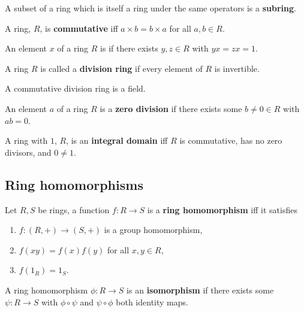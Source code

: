 \documentclass[../Year2.tex]{subfiles}
\begin{document}
\begin{definition}[Subring]
    A subset of a ring which is itself a ring under the same operators is a \textbf{subring}.
\end{definition}

\begin{definition}
    A ring, $R$, is \textbf{commutative} iff $a\times b=b\times a$ for all $a,b\in R$.
\end{definition}

\begin{definition}[Invertible]
    An element $x$ of a ring $R$ is  if there exists $y,z\in R$ with $yx=zx=1$.
\end{definition}

\begin{definition}
    A ring $R$ is called a \textbf{division ring} if every element of $R$ is invertible.
\end{definition}

\begin{remark}
    A commutative division ring is a field.
\end{remark}

\begin{definition}
    An element $a$ of a ring $R$ is a \textbf{zero division} if there exists some $b\neq0\in R$ with $ab=0$.
\end{definition}

\begin{definition}
    A ring with $1$, $R$, is an \textbf{integral domain} iff $R$ is commutative, has no zero divisors, and $0\neq 1$.
\end{definition}

\subsection{Ring homomorphisms}

\begin{definition}
    Let $R,S$ be rings, a function $f:R\rightarrow S$ is a \textbf{ring homomorphism} iff it satisfies \begin{enumerate}
        \item $f:(R,+)\rightarrow (S,+)$ is a group homomorphism,
        \item $f(xy)=f(x)f(y)$ for all $x,y\in R$,
        \item $f(1_R)=1_S$.
    \end{enumerate}
    A ring homomorphism $\phi:R\rightarrow S$ is an \textbf{isomorphism} if there exists some $\psi:R\rightarrow S$ with $\phi\circ\psi$ and $\psi\circ\phi$ both identity maps.
\end{definition}
\end{document}
